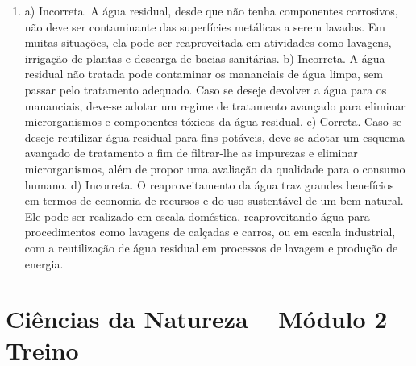 \begin{enumerate}
\item
a) Incorreta. A água residual, desde que não tenha componentes
corrosivos, não deve ser contaminante das superfícies metálicas a serem
lavadas. Em muitas situações, ela pode ser reaproveitada em atividades
como lavagens, irrigação de plantas e descarga de bacias sanitárias.
b) Incorreta. A água residual não tratada pode contaminar os mananciais
de água limpa, sem passar pelo tratamento adequado. Caso se deseje
devolver a água para os mananciais, deve-se adotar um regime de
tratamento avançado para eliminar microrganismos e componentes tóxicos
da água residual.
c) Correta. Caso se deseje reutilizar água residual para fins potáveis,
deve-se adotar um esquema avançado de tratamento a fim de filtrar-lhe as
impurezas e eliminar microrganismos, além de propor uma
avaliação da qualidade para o consumo humano.
d) Incorreta. O reaproveitamento da água traz grandes benefícios em
termos de economia de recursos e do uso sustentável de um bem natural.
Ele pode ser realizado em escala doméstica, reaproveitando água para
procedimentos como lavagens de calçadas e carros, ou em escala
industrial, com a reutilização de água residual em processos de lavagem
e produção de energia.
\end{enumerate}

\section*{Ciências da Natureza -- Módulo 2 -- Treino}

